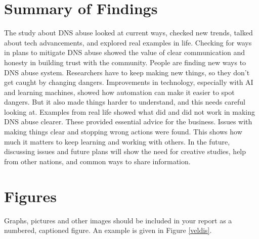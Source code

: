 \section{Summary of Findings}

The study about DNS abuse looked at current ways, checked new trends, talked about tech advancements, and explored real examples in life. Checking for ways in plans to mitigate DNS abuse showed the value of clear communication and honesty in building trust with the community. People are finding new ways to DNS abuse system. Researchers have to keep making new things, so they don't get caught by changing dangers. Improvements in technology, especially with AI and learning machines, showed how automation can make it easier to spot dangers. But it also made things harder to understand, and this needs careful looking at. Examples from real life showed what did and did not work in making DNS abuse clearer. These provided essential advice for the business. Issues with making things clear and stopping wrong actions were found. This shows how much it matters to keep learning and working with others. In the future, discussing issues and future plans will show the need for creative studies, help from other nations, and common ways to share information. 

























\section{Figures}
Graphs, pictures and other images should be included in your report as a numbered, captioned figure. An example is given in Figure \ref{veldis}.

